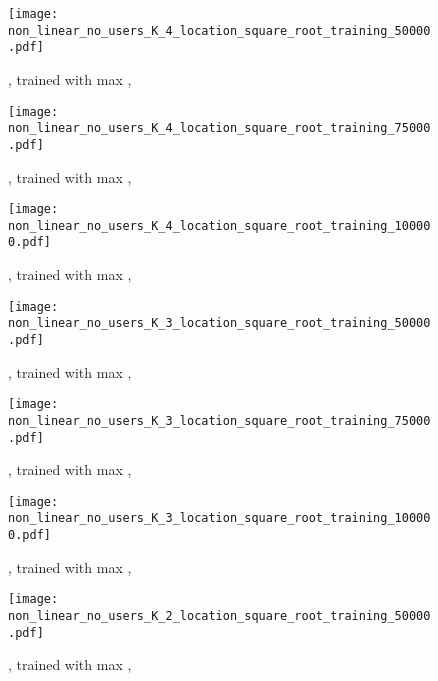 \documentclass{acm_proc_article-sp}
\theoremstyle{plain}
\theoremstyle{plain}
\theoremstyle{plain}
\theoremstyle{plain}
\theoremstyle{plain}
\theoremstyle{plain}
\begin{document}
\begin{figure*}[!t]
        \centering
        \begin{subfigure}[]{0.3\textwidth}
                \texttt{[image: non\_linear\_no\_users\_K\_4\_location\_square\_root\_training\_50000.pdf]}
                \caption{, trained with max , }
                \label{fig:K_4_loc_50000}
        \end{subfigure}
    \begin{subfigure}[]{0.3\textwidth}
                \texttt{[image: non\_linear\_no\_users\_K\_4\_location\_square\_root\_training\_75000.pdf]}
                \caption{, trained with max , }
                \label{fig:K_4_loc_75000}
        \end{subfigure}   
    \begin{subfigure}[]{0.3\textwidth}
                \texttt{[image: non\_linear\_no\_users\_K\_4\_location\_square\_root\_training\_100000.pdf]}
                \caption{, trained with max , }
                \label{fig:K_4_loc_100000}
        \end{subfigure}
    \begin{subfigure}[]{0.3\textwidth}
                \texttt{[image: non\_linear\_no\_users\_K\_3\_location\_square\_root\_training\_50000.pdf]}
                \caption{, trained with max , }
                \label{fig:K_3_loc_50000}
        \end{subfigure}
    \begin{subfigure}[]{0.3\textwidth}
                \texttt{[image: non\_linear\_no\_users\_K\_3\_location\_square\_root\_training\_75000.pdf]}
                \caption{, trained with max , }
                \label{fig:K_3_loc_75000}
        \end{subfigure}
    \begin{subfigure}[]{0.3\textwidth}
                \texttt{[image: non\_linear\_no\_users\_K\_3\_location\_square\_root\_training\_100000.pdf]}
                \caption{, trained with max , }
                \label{fig:K_3_loc_100000}
        \end{subfigure}
    \begin{subfigure}[]{0.3\textwidth}
                \texttt{[image: non\_linear\_no\_users\_K\_2\_location\_square\_root\_training\_50000.pdf]}
                \caption{, trained with max , }
                \label{fig:K_2_loc_50000}
        \end{subfigure}
    \begin{subfigure}[]{0.3\textwidth}

\end{subfigure}
\end{figure*}
\end{document}

